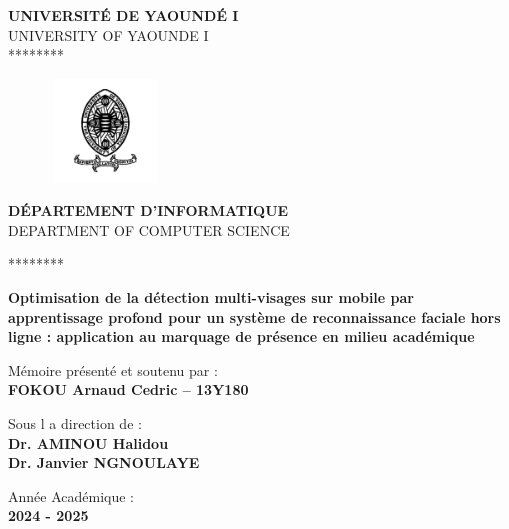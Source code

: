 \sloppy
\thispagestyle{empty}
\begin{titlepage}

\begin{center}
	\textbf{UNIVERSITÉ DE YAOUNDÉ I}
	\\ UNIVERSITY OF YAOUNDE I
	\\ ******** \vspace{0.25cm}\\
\end{center}

\begin{figure}[H]
          \begin{center}
          \includegraphics[width=3cm, height=2.75cm]{img/logoUY1.png}
          \end{center}
\end{figure}
\begin{center}
{\footnotesize \textbf{DÉPARTEMENT D'INFORMATIQUE}}
\\ DEPARTMENT OF COMPUTER SCIENCE 
\begin{center}
	******** \vspace{0.1cm}
\end{center}


	
	\textbf{Optimisation de la détection multi-visages sur mobile par apprentissage profond pour un système de reconnaissance faciale hors ligne : application au marquage de présence en milieu académique}\\\vspace{2cm}
	
	Mémoire présenté et soutenu par :\\\vspace{0.2cm}
	\textbf{FOKOU Arnaud Cedric  –   13Y180}\vspace{2cm}
		
     Sous l a direction de :\\
	\textbf{Dr. AMINOU Halidou}\\
    \textbf{Dr. Janvier NGNOULAYE}\\\vspace{0.35cm}
	
	Année Académique :
	\\\textbf{2024 - 2025}\\\vspace{0.25cm}
	

\end{center}
\end{titlepage}